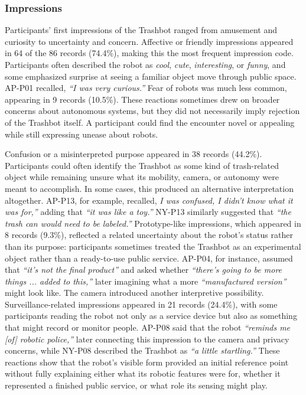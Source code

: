 \subsubsection{Impressions}

Participants' first impressions of the Trashbot ranged from amusement and curiosity to uncertainty and concern. Affective or friendly impressions appeared in 64 of the 86 records (74.4\%), making this the most frequent impression code. Participants often described the robot as \textit{cool}, \textit{cute}, \textit{interesting}, or \textit{funny}, and some emphasized surprise at seeing a familiar object move through public space. AP-P01 recalled, \emph{``I was very curious.''} Fear of robots was much less common, appearing in 9 records (10.5\%). These reactions sometimes drew on broader concerns about autonomous systems, but they did not necessarily imply rejection of the Trashbot itself. A participant could find the encounter novel or appealing while still expressing unease about robots.

Confusion or a misinterpreted purpose appeared in 38 records (44.2\%). Participants could often identify the Trashbot as some kind of trash-related object while remaining unsure what its mobility, camera, or autonomy were meant to accomplish. In some cases, this produced an alternative interpretation altogether. AP-P13, for example, recalled, \emph{I was confused, I didn't know what it was for,''} adding that \emph{``it was like a toy.''} NY-P13 similarly suggested that \emph{``the trash can would need to be labeled.''} Prototype-like impressions, which appeared in 8 records (9.3\%), reflected a related uncertainty about the robot's status rather than its purpose: participants sometimes treated the Trashbot as an experimental object rather than a ready-to-use public service. AP-P04, for instance, assumed that \emph{``it's not the final product''} and asked whether \emph{``there's going to be more things ... added to this,''} later imagining what a more \emph{``manufactured version''} might look like. The camera introduced another interpretive possibility. Surveillance-related impressions appeared in 21 records (24.4\%), with some participants reading the robot not only as a service device but also as something that might record or monitor people. AP-P08 said that the robot \emph{``reminds me [of] robotic police,''} later connecting this impression to the camera and privacy concerns, while NY-P08 described the Trashbot as \emph{``a little startling.''} These reactions show that the robot's visible form provided an initial reference point without fully explaining either what its robotic features were for, whether it represented a finished public service, or what role its sensing might play.

